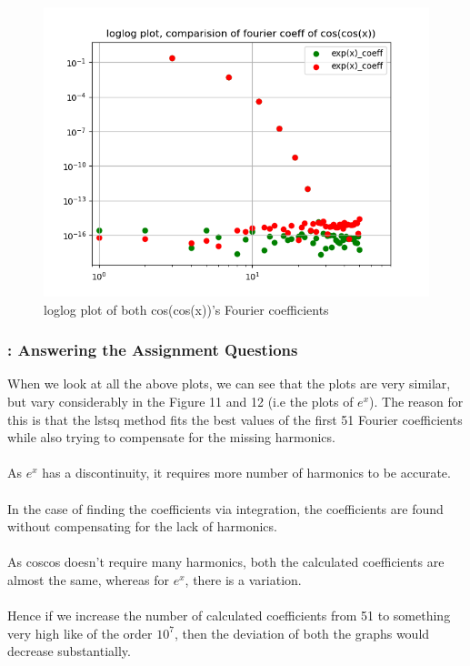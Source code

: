 \documentclass[11pt]{article}
\begin{document}
\begin{figure}[H]
    \centering
    \includegraphics[scale = 0.5]{Figure_14.png}
    \caption{loglog plot of both cos(cos(x))'s Fourier coefficients}
\end{figure}

\subsubsection{: Answering the Assignment Questions}
When we look at all the above plots, we can see that the plots are very similar, but vary considerably in the Figure 11 and 12 (i.e the plots of $e^{x}$). The reason for this is that the lstsq method fits the best values of the first 51 Fourier coefficients while also trying to compensate for the missing harmonics.\\
\\As $e^{x}$ has a discontinuity, it requires more number of harmonics to be accurate.\\
\\In the case of finding the coefficients via integration, the coefficients are found without compensating for the lack of harmonics.\\
\\As coscos doesn't require many harmonics, both the calculated coefficients are almost the same, whereas for $e^{x}$, there is a variation.\\
\\Hence if we increase the number of calculated coefficients from 51 to something very high like of the order $10^7$, then the deviation of both the graphs would decrease substantially.
\end{document}
